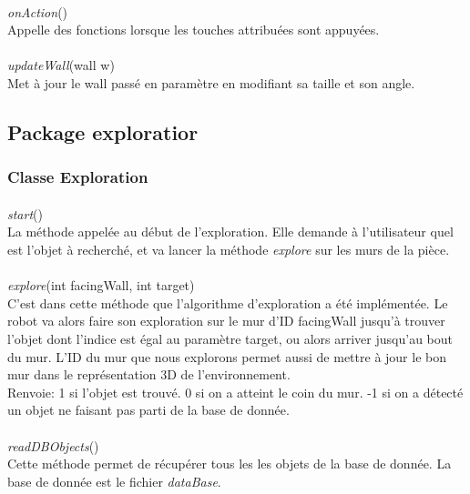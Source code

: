 \documentclass[12pt]{report}
\begin{document}
\paragraph{}
\textit{onAction}()\\
Appelle des fonctions lorsque les touches attribuées sont appuyées.

\paragraph{}
\textit{updateWall}(wall w)\\
Met à jour le wall passé en paramètre en modifiant sa taille et son angle.

\subsection{Package exploratior}

\subsubsection{Classe Exploration}

\paragraph{}
\textit{start}()\\
La méthode appelée au début de l'exploration. Elle demande à l'utilisateur quel est l'objet à recherché, et va lancer la méthode \textit{explore} sur les murs de la pièce.


\paragraph{}
\textit{explore}(int facingWall, int target)\\
C'est dans cette méthode que l'algorithme d'exploration a été implémentée. Le robot va alors faire son exploration sur le mur d'ID facingWall jusqu'à trouver l'objet dont l'indice est égal au paramètre target, ou alors arriver jusqu'au bout du mur. L'ID du mur que nous explorons permet aussi de mettre à jour le bon mur dans le représentation 3D de l'environnement.\\
Renvoie: 1 si l'objet est trouvé. 0 si on a atteint le coin du mur. -1 si on a détecté un objet ne faisant pas parti de la base de donnée.

\paragraph{}
\textit{readDBObjects}()\\
Cette méthode permet de récupérer tous les les objets de la base de donnée. La base de donnée est le fichier \textit{dataBase}.
\end{document}
